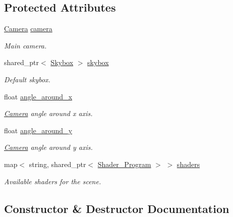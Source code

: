 \subsection*{Protected Attributes}
\begin{DoxyCompactItemize}
\item 
\mbox{\hyperlink{classexample_1_1_camera}{Camera}} \mbox{\hyperlink{classexample_1_1_scene_a44bfea9e279b461235fff82b3b241be2}{camera}}
\begin{DoxyCompactList}\small\item\em Main camera. \end{DoxyCompactList}\item 
shared\+\_\+ptr$<$ \mbox{\hyperlink{classexample_1_1_skybox}{Skybox}} $>$ \mbox{\hyperlink{classexample_1_1_scene_ad20f50fcaf3d8deef29ddb83108185a2}{skybox}}
\begin{DoxyCompactList}\small\item\em Default skybox. \end{DoxyCompactList}\item 
float \mbox{\hyperlink{classexample_1_1_scene_a4f3b06f8a07cf82c5876be93a036ac8c}{angle\+\_\+around\+\_\+x}}
\begin{DoxyCompactList}\small\item\em \mbox{\hyperlink{classexample_1_1_camera}{Camera}} angle around x axis. \end{DoxyCompactList}\item 
float \mbox{\hyperlink{classexample_1_1_scene_a9bf6905673690b7f9345c7543db5c63d}{angle\+\_\+around\+\_\+y}}
\begin{DoxyCompactList}\small\item\em \mbox{\hyperlink{classexample_1_1_camera}{Camera}} angle around y axis. \end{DoxyCompactList}\item 
map$<$ string, shared\+\_\+ptr$<$ \mbox{\hyperlink{classexample_1_1_shader___program}{Shader\+\_\+\+Program}} $>$ $>$ \mbox{\hyperlink{classexample_1_1_scene_af21081d9e0af2bbdd958a3fdf3460031}{shaders}}
\begin{DoxyCompactList}\small\item\em Available shaders for the scene. \end{DoxyCompactList}\end{DoxyCompactItemize}


\subsection{Constructor \& Destructor Documentation}
\mbox{\label{classexample_1_1_scene_a70c556631b334b52249e8c3de5dfbdb3}} 
